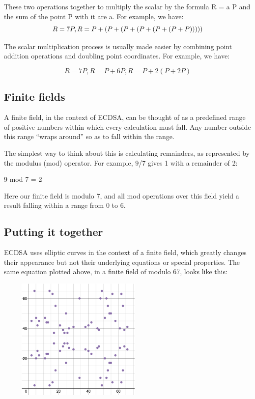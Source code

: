 \begin{flushleft}
These two operations together to multiply the scalar by the formula R = a P and the sum of the point P with it are a. For example, we have:
\begin{equation}
R=7P,\newline
R=P+(P+(P+(P+(P+(P+P)))))
\end{equation}

The scalar multiplication process is usually made easier by combining point addition operations and doubling point coordinates. For example, we have:

\begin{equation}
R=7P,
R=P+6P,
R=P+2(P+2P)
\end{equation}

\subsection{Finite fields}
A finite field, in the context of ECDSA, can be thought of as a predefined range of positive numbers within which every calculation must fall. Any number outside this range “wraps around” so as to fall within the range.

The simplest way to think about this is calculating remainders, as represented by the modulus (mod) operator. For example, 9/7 gives 1 with a remainder of 2:

9 mod 7 = 2

Here our finite field is modulo 7, and all mod operations over this field yield a result falling within a range from 0 to 6.

\subsection{Putting it together}

ECDSA uses elliptic curves in the context of a finite field, which greatly changes their appearance but not their underlying equations or special properties. The same equation plotted above, in a finite field of modulo 67, looks like this:
\end{flushleft}
\centering\includegraphics[width=8cm, height=6cm]{charts/4.png}

